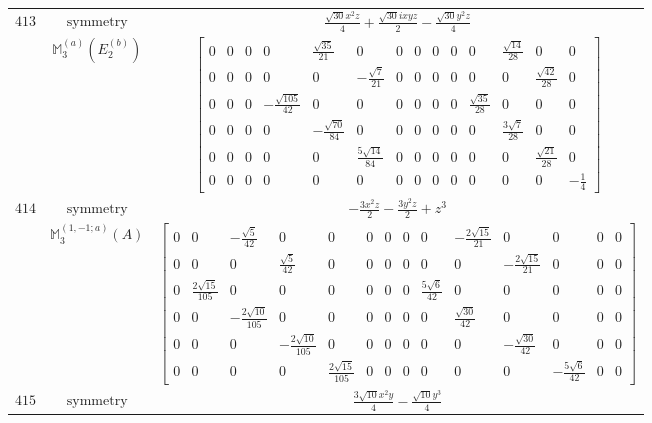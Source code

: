 \documentclass[fleqn,8pt,landscape]{jsarticle}
\begin{document}
\begin{longtable}{ccc}
$ 413 $ & $ \text{symmetry} $ & $ \frac{\sqrt{30} x^{2} z}{4} + \frac{\sqrt{30} i x y z}{2} - \frac{\sqrt{30} y^{2} z}{4} $ \\
$  $ & $ \mathbb{M}_{3}^{(a)}(E_{2}^{(b)}) $ & $ \begin{bmatrix} 0 & 0 & 0 & 0 & \frac{\sqrt{35}}{21} & 0 & 0 & 0 & 0 & 0 & 0 & \frac{\sqrt{14}}{28} & 0 & 0 \\ 0 & 0 & 0 & 0 & 0 & - \frac{\sqrt{7}}{21} & 0 & 0 & 0 & 0 & 0 & 0 & \frac{\sqrt{42}}{28} & 0 \\ 0 & 0 & 0 & - \frac{\sqrt{105}}{42} & 0 & 0 & 0 & 0 & 0 & 0 & \frac{\sqrt{35}}{28} & 0 & 0 & 0 \\ 0 & 0 & 0 & 0 & - \frac{\sqrt{70}}{84} & 0 & 0 & 0 & 0 & 0 & 0 & \frac{3 \sqrt{7}}{28} & 0 & 0 \\ 0 & 0 & 0 & 0 & 0 & \frac{5 \sqrt{14}}{84} & 0 & 0 & 0 & 0 & 0 & 0 & \frac{\sqrt{21}}{28} & 0 \\ 0 & 0 & 0 & 0 & 0 & 0 & 0 & 0 & 0 & 0 & 0 & 0 & 0 & - \frac{1}{4} \end{bmatrix} $ \\ \hline
$ 414 $ & $ \text{symmetry} $ & $ - \frac{3 x^{2} z}{2} - \frac{3 y^{2} z}{2} + z^{3} $ \\
$  $ & $ \mathbb{M}_{3}^{(1,-1;a)}(A) $ & $ \begin{bmatrix} 0 & 0 & - \frac{\sqrt{5}}{42} & 0 & 0 & 0 & 0 & 0 & 0 & - \frac{2 \sqrt{15}}{21} & 0 & 0 & 0 & 0 \\ 0 & 0 & 0 & \frac{\sqrt{5}}{42} & 0 & 0 & 0 & 0 & 0 & 0 & - \frac{2 \sqrt{15}}{21} & 0 & 0 & 0 \\ 0 & \frac{2 \sqrt{15}}{105} & 0 & 0 & 0 & 0 & 0 & 0 & \frac{5 \sqrt{6}}{42} & 0 & 0 & 0 & 0 & 0 \\ 0 & 0 & - \frac{2 \sqrt{10}}{105} & 0 & 0 & 0 & 0 & 0 & 0 & \frac{\sqrt{30}}{42} & 0 & 0 & 0 & 0 \\ 0 & 0 & 0 & - \frac{2 \sqrt{10}}{105} & 0 & 0 & 0 & 0 & 0 & 0 & - \frac{\sqrt{30}}{42} & 0 & 0 & 0 \\ 0 & 0 & 0 & 0 & \frac{2 \sqrt{15}}{105} & 0 & 0 & 0 & 0 & 0 & 0 & - \frac{5 \sqrt{6}}{42} & 0 & 0 \end{bmatrix} $ \\ \hline
$ 415 $ & $ \text{symmetry} $ & $ \frac{3 \sqrt{10} x^{2} y}{4} - \frac{\sqrt{10} y^{3}}{4} $ \\

\end{longtable}
\end{document}
